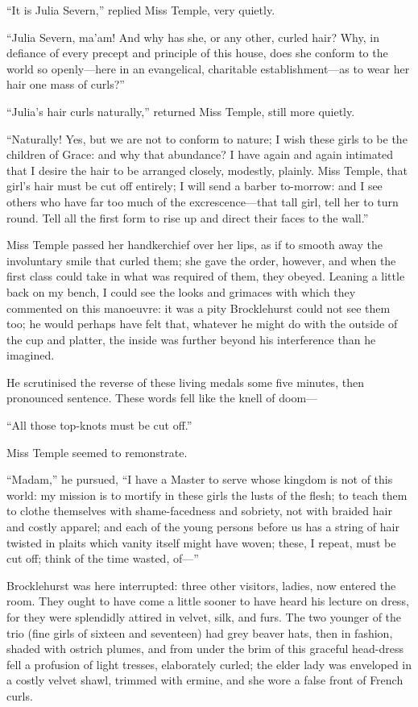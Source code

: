 \enquote{It is Julia Severn,} replied Miss Temple, very quietly.

\enquote{Julia Severn, ma'am! And why has she, or any other, curled
hair? Why, in defiance of every precept and principle of this house,
does she conform to the world so openly---here in an evangelical,
charitable establishment---as to wear her hair one mass of curls?}

\enquote{Julia's hair curls naturally,} returned Miss Temple, still more
quietly.

\enquote{Naturally! Yes, but we are not to conform to nature; I wish
these girls to be the children of Grace: and why that abundance? I have
again and again intimated that I desire the hair to be arranged closely,
modestly, plainly. Miss Temple, that girl's hair must be cut off
entirely; I will send a barber to-morrow: and I see others who have far
too much of the excrescence---that tall girl, tell her to turn round. 
Tell all the first form to rise up and direct their faces to the wall.}

Miss Temple passed her handkerchief over her lips, as if to smooth away
the involuntary smile that curled them; she gave the order, however, and
when the first class could take in what was required of them, they
obeyed. Leaning a little back on my bench, I could see the looks and
grimaces with which they commented on this manoeuvre: it was a pity \Mr{}
Brocklehurst could not see them too; he would perhaps have felt that,
whatever he might do with the outside of the cup and platter, the inside
was further beyond his interference than he imagined.

He scrutinised the reverse of these living medals some five minutes,
then pronounced sentence. These words fell like the knell of doom---

\enquote{All those top-knots must be cut off.}

Miss Temple seemed to remonstrate.

\enquote{Madam,} he pursued, \enquote{I have a Master to serve whose
kingdom is not of this world: my mission is to mortify in these girls
the lusts of the flesh; to teach them to clothe themselves with
shame-facedness and sobriety, not with braided hair and costly apparel;
and each of the young persons before us has a string of hair twisted in
plaits which vanity itself might have woven; these, I repeat, must be
cut off; think of the time wasted, of---}

\Mr{} Brocklehurst was here interrupted: three other visitors, ladies, now
entered the room. They ought to have come a little sooner to have heard
his lecture on dress, for they were splendidly attired in velvet, silk,
and furs. The two younger of the trio (fine girls of sixteen and
seventeen) had grey beaver hats, then in fashion, shaded with ostrich
plumes, and from under the brim of this graceful head-dress fell a
profusion of light tresses, elaborately curled; the elder lady was
enveloped in a costly velvet shawl, trimmed with ermine, and she wore a
false front of French curls.

